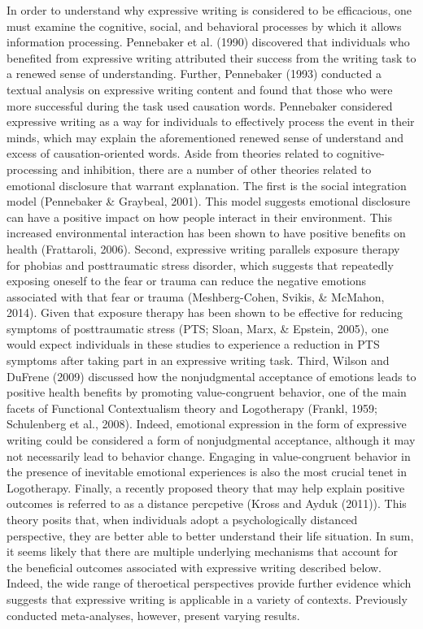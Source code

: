 \documentclass[english,man, mask]{apa6}
\theoremstyle{definition}
\theoremstyle{definition}
\theoremstyle{definition}
\theoremstyle{remark}
\begin{document}
In order to understand why expressive writing is considered to be
efficacious, one must examine the cognitive, social, and behavioral
processes by which it allows information processing. Pennebaker et al.
(1990) discovered that individuals who benefited from expressive writing
attributed their success from the writing task to a renewed sense of
understanding. Further, Pennebaker (1993) conducted a textual analysis
on expressive writing content and found that those who were more
successful during the task used causation words. Pennebaker considered
expressive writing as a way for individuals to effectively process the
event in their minds, which may explain the aforementioned renewed sense
of understand and excess of causation-oriented words. Aside from
theories related to cognitive-processing and inhibition, there are a
number of other theories related to emotional disclosure that warrant
explanation. The first is the social integration model (Pennebaker \&
Graybeal, 2001). This model suggests emotional disclosure can have a
positive impact on how people interact in their environment. This
increased environmental interaction has been shown to have positive
benefits on health (Frattaroli, 2006). Second, expressive writing
parallels exposure therapy for phobias and posttraumatic stress
disorder, which suggests that repeatedly exposing oneself to the fear or
trauma can reduce the negative emotions associated with that fear or
trauma (Meshberg-Cohen, Svikis, \& McMahon, 2014). Given that exposure
therapy has been shown to be effective for reducing symptoms of
posttraumatic stress (PTS; Sloan, Marx, \& Epstein, 2005), one would
expect individuals in these studies to experience a reduction in PTS
symptoms after taking part in an expressive writing task. Third, Wilson
and DuFrene (2009) discussed how the nonjudgmental acceptance of
emotions leads to positive health benefits by promoting value-congruent
behavior, one of the main facets of Functional Contextualism theory and
Logotherapy (Frankl, 1959; Schulenberg et al., 2008). Indeed, emotional
expression in the form of expressive writing could be considered a form
of nonjudgmental acceptance, although it may not necessarily lead to
behavior change. Engaging in value-congruent behavior in the presence of
inevitable emotional experiences is also the most crucial tenet in
Logotherapy. Finally, a recently proposed theory that may help explain
positive outcomes is referred to as a distance percpetive (Kross and
Ayduk (2011)). This theory posits that, when individuals adopt a
psychologically distanced perspective, they are better able to better
understand their life situation. In sum, it seems likely that there are
multiple underlying mechanisms that account for the beneficial outcomes
associated with expressive writing described below. Indeed, the wide
range of theroetical perspectives provide further evidence which
suggests that expressive writing is applicable in a variety of contexts.
Previously conducted meta-analyses, however, present varying results.
\end{document}
